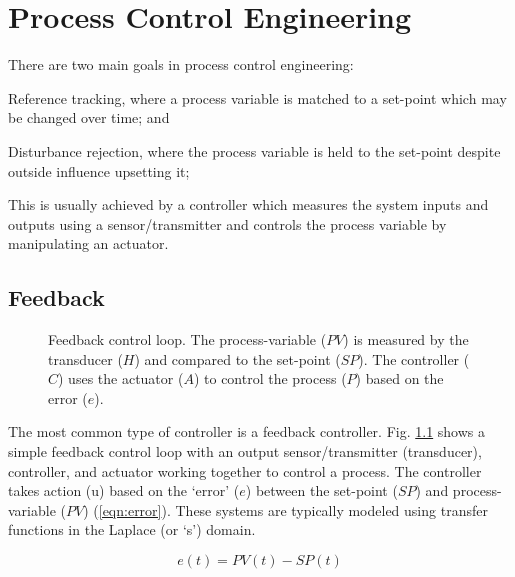 \chapter{Process Control Engineering}
\label{Chapter:Controls}

There are two main goals in process control engineering:
\begin{enumerate*}
    \item Reference tracking, where a process variable is matched to a set-point which may be changed over time; and 
    \item Disturbance rejection, where the process variable is held to the set-point despite outside influence upsetting it;
\end{enumerate*}
This is usually achieved by a controller which measures the system inputs and outputs using a sensor/transmitter and controls the process variable by manipulating an actuator. 

\section{Feedback}
\begin{figure}[!ht]
    \centering
    
    \caption[Feedback control loop]{Feedback control loop. The process-variable ($PV$) is measured by the transducer ($H$) and compared to the set-point ($SP$). The controller ($C$) uses the actuator ($A$) to control the process ($P$) based on the error ($e$).}
    \label{fig:tikz_feedback}
\end{figure}

The most common type of controller is a feedback controller. Fig. \ref{fig:tikz_feedback} shows a simple feedback control loop with an output sensor/transmitter (\ie transducer), controller, and actuator working together to control a process. The controller takes action (u) based on the `error' ($e$) between the set-point ($SP$) and process-variable ($PV$) (\ref{eqn:error}). These systems are typically modeled using transfer functions in the Laplace (or `s') domain.

\begin{equation}\label{eqn:error}
    e(t) = PV(t) - SP(t)
\end{equation}

